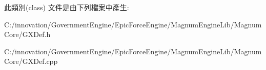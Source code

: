 此類別(class) 文件是由下列檔案中產生\+:\begin{DoxyCompactItemize}
\item 
C\+:/innovation/\+Government\+Engine/\+Epic\+Force\+Engine/\+Magnum\+Engine\+Lib/\+Magnum\+Core/G\+X\+Def.\+h\item 
C\+:/innovation/\+Government\+Engine/\+Epic\+Force\+Engine/\+Magnum\+Engine\+Lib/\+Magnum\+Core/G\+X\+Def.\+cpp\end{DoxyCompactItemize}
